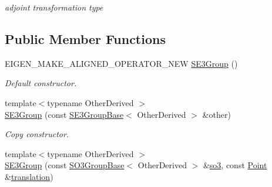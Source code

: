 \begin{DoxyCompactItemize}
\begin{DoxyCompactList}\small\item\em adjoint transformation type \end{DoxyCompactList}\end{DoxyCompactItemize}
\subsection*{Public Member Functions}
\begin{DoxyCompactItemize}
\item 
E\+I\+G\+E\+N\+\_\+\+M\+A\+K\+E\+\_\+\+A\+L\+I\+G\+N\+E\+D\+\_\+\+O\+P\+E\+R\+A\+T\+O\+R\+\_\+\+N\+EW \hyperlink{class_sophus_1_1_s_e3_group_a80bb686e6bac8f4cc61b77997b0a6f14}{S\+E3\+Group} ()
\begin{DoxyCompactList}\small\item\em Default constructor. \end{DoxyCompactList}\item 
{\footnotesize template$<$typename Other\+Derived $>$ }\\\hyperlink{class_sophus_1_1_s_e3_group_a5d0436f003940eb003e7c4c2e93b0fbb}{S\+E3\+Group} (const \hyperlink{class_sophus_1_1_s_e3_group_base}{S\+E3\+Group\+Base}$<$ Other\+Derived $>$ \&other)\hypertarget{class_sophus_1_1_s_e3_group_a5d0436f003940eb003e7c4c2e93b0fbb}{}\label{class_sophus_1_1_s_e3_group_a5d0436f003940eb003e7c4c2e93b0fbb}

\begin{DoxyCompactList}\small\item\em Copy constructor. \end{DoxyCompactList}\item 
{\footnotesize template$<$typename Other\+Derived $>$ }\\\hyperlink{class_sophus_1_1_s_e3_group_a45e971f2159032ba8019a1e082e0ce01}{S\+E3\+Group} (const \hyperlink{class_sophus_1_1_s_o3_group_base}{S\+O3\+Group\+Base}$<$ Other\+Derived $>$ \&\hyperlink{class_sophus_1_1_s_e3_group_a7c397c3a78893feeba4ec2034943b522}{so3}, const \hyperlink{class_sophus_1_1_s_e3_group_ab2257f9298559ef83bbeffd386a50e1d}{Point} \&\hyperlink{class_sophus_1_1_s_e3_group_a1bfd300de4529a2f6ba0ff5baecea98e}{translation})\hypertarget{class_sophus_1_1_s_e3_group_a45e971f2159032ba8019a1e082e0ce01}{}\label{class_sophus_1_1_s_e3_group_a45e971f2159032ba8019a1e082e0ce01}


\end{DoxyCompactItemize}
